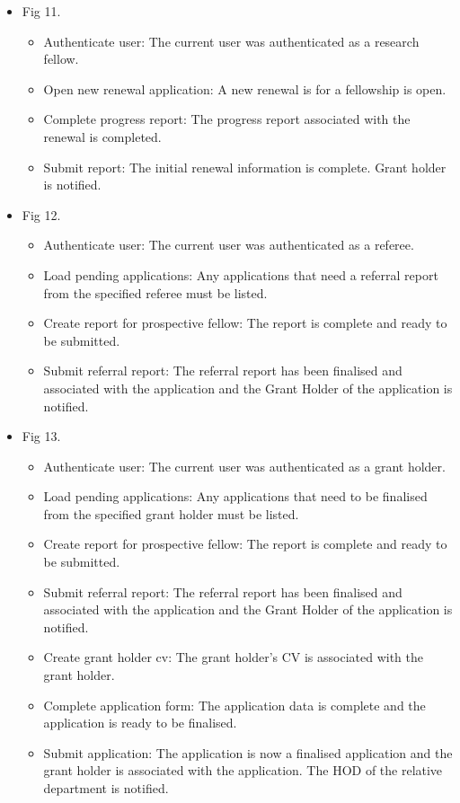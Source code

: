 \documentclass[12pt]{article}
\begin{document}
\begin{itemize}
	\item Fig 11.
		\begin{itemize}
			\item Authenticate user: The current user was authenticated as a research fellow.
			\item Open new renewal application: A new renewal is for a fellowship is open.
			\item Complete progress report: The progress report associated with	the renewal is completed.		
			\item Submit report: The initial renewal information is complete. Grant holder is notified.											
		\end{itemize}
	
	\item Fig 12.
		\begin{itemize}
			\item Authenticate user: The current user was authenticated as a referee.
			\item Load pending applications: Any applications that need a referral report from the specified referee must be listed.
			\item Create report for prospective fellow: The report is complete and ready to be submitted.				
			\item Submit referral report: The referral report has been finalised and associated with the application and the Grant Holder of the application is notified.									
		\end{itemize}
	\item Fig 13.
		\begin{itemize}
			\item Authenticate user: The current user was authenticated as a grant holder.
			\item Load pending applications: Any applications that need to be finalised from the specified grant holder must be listed.
			\item Create report for prospective fellow: The report is complete and ready to be submitted.				
			\item Submit referral report: The referral report has been finalised and associated with the application and the Grant Holder of the application is notified.
			\item Create grant holder cv: The grant holder's CV is associated with the grant holder.
			\item Complete application form: The application data is complete and the application is ready to be finalised.
			\item Submit application: The application is now a finalised application and the grant holder is associated with the application. The HOD of the relative department is notified. 									

\end{itemize}
\end{itemize}
\end{document}
